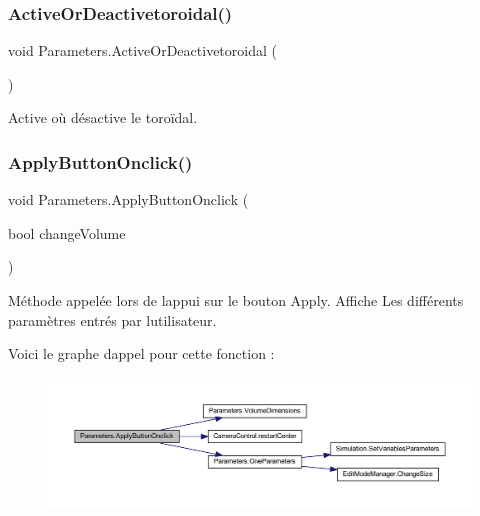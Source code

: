 \subsubsection{\texorpdfstring{Active\+Or\+Deactivetoroidal()}{ActiveOrDeactivetoroidal()}}
{\footnotesize\ttfamily void Parameters.\+Active\+Or\+Deactivetoroidal (\begin{DoxyParamCaption}{ }\end{DoxyParamCaption})\hspace{0.3cm}{\ttfamily [inline]}}



Active où désactive le toroïdal. 

\mbox{\label{class_parameters_a8702daf046aa4d1c44a284c78f6ff058}} 
\subsubsection{\texorpdfstring{Apply\+Button\+Onclick()}{ApplyButtonOnclick()}}
{\footnotesize\ttfamily void Parameters.\+Apply\+Button\+Onclick (\begin{DoxyParamCaption}\item[{bool}]{change\+Volume }\end{DoxyParamCaption})\hspace{0.3cm}{\ttfamily [inline]}}



Méthode appelée lors de l\textquotesingle{}appui sur le bouton Apply. Affiche Les différents paramètres entrés par l\textquotesingle{}utilisateur. 

Voici le graphe d\textquotesingle{}appel pour cette fonction \+:
\nopagebreak
\begin{figure}[H]
\begin{center}
\leavevmode
\includegraphics[width=350pt]{class_parameters_a8702daf046aa4d1c44a284c78f6ff058_cgraph}
\end{center}
\end{figure}
\mbox{\label{class_parameters_a8438e2686a572fc6d1cc2947489da01d}} 
